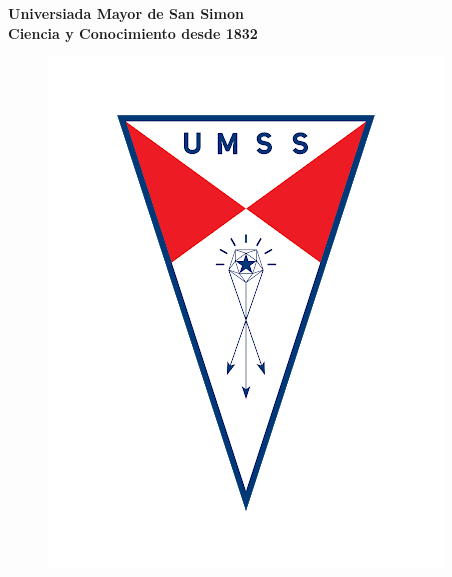 \begin{titlepage}
	\begin{center}
		{\LARGE \textbf {Universiada Mayor de San Simon}}\\
		\vspace{0.25cm}
		{\large \textbf{Ciencia y Conocimiento desde 1832}}
		\vspace{0.25cm}
		\begin{figure}[h]
			\centering
			\includegraphics[scale=0.25]{imagenes/logo-umss.png}
		\end{figure}		
	\end{center}
\end{titlepage}